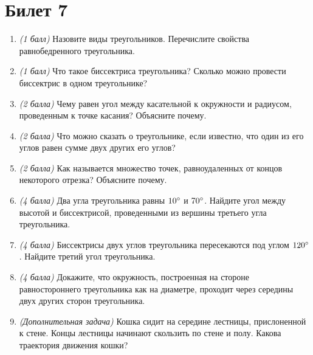 \documentclass[12pt, a4paper]{article}
\begin{document}
\section*{Билет 7}
\begin{enumerate}
\item \textit{(1 балл)} Назовите виды треугольников. Перечислите свойства равнобедренного треугольника.
\item \textit{(1 балл)} Что такое биссектриса треугольника? Сколько можно провести биссектрис в одном треугольнике?
\item \textit{(2 балла)} Чему равен угол между касательной к окружности и радиусом, проведенным к точке касания? Объясните почему.
\item \textit{(2 балла)} Что можно сказать о треугольнике, если известно, что один из его углов равен сумме двух других его углов?
\item \textit{(2 балла)} Как называется множество точек, равноудаленных от концов некоторого отрезка? Объясните почему.
\item \textit{(4 балла)} Два угла треугольника равны $10\degree$ и $70\degree$. Найдите угол между высотой и биссектрисой, проведенными из вершины третьего угла треугольника.
\item \textit{(4 балла)} Биссектрисы двух углов треугольника пересекаются под углом $120\degree$. Найдите третий угол треугольника.
\item \textit{(4 балла)} Докажите, что окружность, построенная на стороне равностороннего треугольника как на диаметре, проходит через середины двух других сторон треугольника.
\item \textit{(Дополнительная задача)} Кошка сидит на середине лестницы, прислоненной к стене. Концы лестницы начинают скользить по стене и полу. Какова траектория движения кошки?
\end{enumerate}
\end{document}
